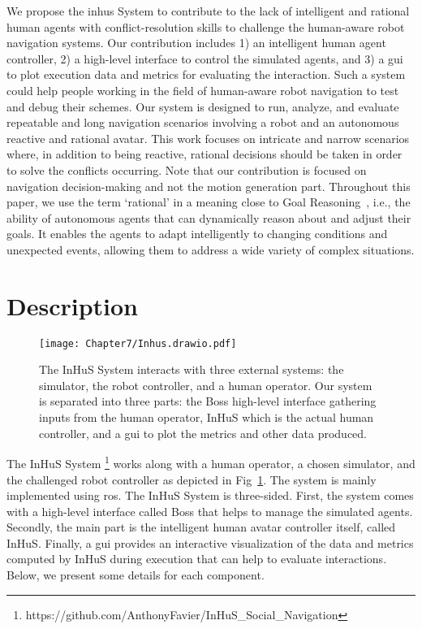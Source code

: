 We propose the \acrfull{inhus} System to contribute to the lack of intelligent and rational human agents with conflict-resolution skills to challenge the human-aware robot navigation systems. Our contribution includes 1) an intelligent human agent controller, 2) a high-level interface to control the simulated agents, and 3) a \acrfull{gui} to plot execution data and metrics for evaluating the interaction. Such a system could help people working in the field of human-aware robot navigation to test and debug their schemes. Our system is designed to run, analyze, and evaluate repeatable and long navigation scenarios involving a robot and an autonomous reactive and rational avatar. This work focuses on intricate and narrow scenarios where, in addition to being reactive, rational decisions should be taken in order to solve the conflicts occurring. Note that our contribution is focused on navigation decision-making and not the motion generation part. Throughout this paper, we use the term `rational' in a meaning close to Goal Reasoning~\cite{vattam_breadth_nodate,abbass_goal_2018}, i.e., the ability of autonomous agents that can dynamically reason about and adjust their goals. It enables the agents to adapt intelligently to changing conditions and unexpected events, allowing them to address a wide variety of complex situations.


\section{Description}
 
\begin{figure}[ht]
    \centering
    \texttt{[image: Chapter7/Inhus.drawio.pdf]}
    \caption{
    The InHuS System interacts with three external systems: the simulator, the robot controller, and a human operator. Our system is separated into three parts: the Boss high-level interface gathering inputs from the human operator, InHuS which is the actual human controller, and a \acrshort{gui} to plot the metrics and other data produced.
    }
    \label{fig:overview_inhus}
    \vspace{-0.8cm}
\end{figure}

The InHuS System%
\footnote{https://github.com/AnthonyFavier/InHuS\_Social\_Navigation}
works along with a human operator, a chosen simulator, and the challenged robot controller as depicted in Fig~\ref{fig:overview_inhus}. The system is mainly implemented using \acrshort{ros}. The InHuS  System is three-sided. First, the system comes with a high-level interface called Boss that helps to manage the simulated agents. Secondly, the main part is the intelligent human avatar controller itself, called InHuS.
Finally, a \acrshort{gui} provides an interactive visualization of the data and metrics computed by InHuS during execution that can help to evaluate interactions. Below, we present some details for each component.


